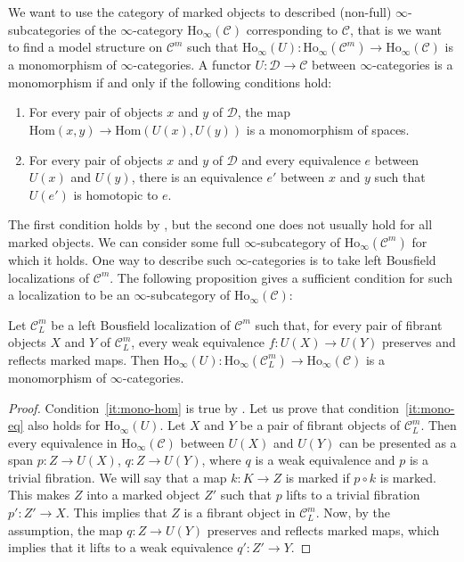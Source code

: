 \documentclass[reqno]{amsart}
\theoremstyle{definition}
\theoremstyle{remark}
\newcommand{\fs}[1]{\mathrm{#1}}
\newcommand{\Hom}{\fs{Hom}}
\newcommand{\Ho}{\fs{Ho}}
\newcommand{\cat}[1]{\mathcal{#1}}
\newcommand{\C}{\cat{C}}
\newcommand{\D}{\cat{D}}
\numberwithin{figure}{section}
\begin{document}
We want to use the category of marked objects to described (non-full) $\infty$-subcategories of the $\infty$-category $\Ho_\infty(\C)$ corresponding to $\C$,
that is we want to find a model structure on $\C^m$ such that $\Ho_\infty(U) : \Ho_\infty(\C^m) \to \Ho_\infty(\C)$ is a monomorphism of $\infty$-categories.
A functor $U : \D \to \C$ between $\infty$-categories is a monomorphism if and only if the following conditions hold:
\begin{enumerate}
\item \label{it:mono-hom} For every pair of objects $x$ and $y$ of $\D$, the map $\Hom(x,y) \to \Hom(U(x),U(y))$ is a monomorphism of spaces.
\item \label{it:mono-eq} For every pair of objects $x$ and $y$ of $\D$ and every equivalence $e$ between $U(x)$ and $U(y)$, there is an equivalence $e'$ between $x$ and $y$ such that $U(e')$ is homotopic to $e$.
\end{enumerate}

The first condition holds by , but the second one does not usually hold for all marked objects.
We can consider some full $\infty$-subcategory of $\Ho_\infty(\C^m)$ for which it holds.
One way to describe such $\infty$-categories is to take left Bousfield localizations of $\C^m$.
The following proposition gives a sufficient condition for such a localization to be an $\infty$-subcategory of $\Ho_\infty(\C)$:

\begin{prop}
Let $\C^m_L$ be a left Bousfield localization of $\C^m$ such that, for every pair of fibrant objects $X$ and $Y$ of $\C^m_L$, every weak equivalence $f : U(X) \to U(Y)$ preserves and reflects marked maps.
Then $\Ho_\infty(U) : \Ho_\infty(\C^m_L) \to \Ho_\infty(\C)$ is a monomorphism of $\infty$-categories.
\end{prop}
\begin{proof}
Condition~\eqref{it:mono-hom} is true by .
Let us prove that condition~\eqref{it:mono-eq} also holds for $\Ho_\infty(U)$.
Let $X$ and $Y$ be a pair of fibrant objects of $\C^m_L$.
Then every equivalence in $\Ho_\infty(\C)$ between $U(X)$ and $U(Y)$ can be presented as a span $p : Z \to U(X)$, $q : Z \to U(Y)$, where $q$ is a weak equivalence and $p$ is a trivial fibration.
We will say that a map $k : K \to Z$ is marked if $p \circ k$ is marked.
This makes $Z$ into a marked object $Z'$ such that $p$ lifts to a trivial fibration $p' : Z' \to X$.
This implies that $Z$ is a fibrant object in $\C^m_L$.
Now, by the assumption, the map $q : Z \to U(Y)$ preserves and reflects marked maps,
which implies that it lifts to a weak equivalence $q' : Z' \to Y$.
\end{proof}
\end{document}
